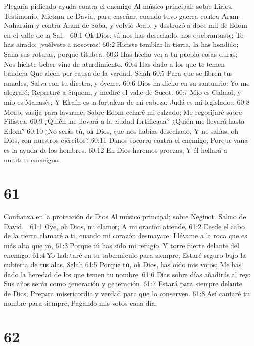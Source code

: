 Plegaria pidiendo ayuda contra el enemigo 
Al músico principal; sobre Lirios. Testimonio. Mictam de David, para enseñar, cuando tuvo guerra contra Aram-Naharaim y contra Aram de Soba, y volvió Joab, y destrozó a doce mil de Edom en el valle de la Sal. 

60:1 Oh Dios, tú nos has desechado, nos quebrantaste; 
Te has airado; ¡vuélvete a nosotros! 
60:2 Hiciste temblar la tierra, la has hendido; 
Sana sus roturas, porque titubea. 
60:3 Has hecho ver a tu pueblo cosas duras; 
Nos hiciste beber vino de aturdimiento. 
60:4 Has dado a los que te temen bandera 
Que alcen por causa de la verdad. Selah 
60:5 Para que se libren tus amados, 
Salva con tu diestra, y óyeme. 
60:6 Dios ha dicho en su santuario: Yo me alegraré; 
Repartiré a Siquem, y mediré el valle de Sucot. 
60:7 Mío es Galaad, y mío es Manasés; 
Y Efraín es la fortaleza de mi cabeza; 
Judá es mi legislador. 
60:8 Moab, vasija para lavarme; 
Sobre Edom echaré mi calzado; 
Me regocijaré sobre Filistea. 
60:9 ¿Quién me llevará a la ciudad fortificada? 
¿Quién me llevará hasta Edom? 
60:10 ¿No serás tú, oh Dios, que nos habías desechado, 
Y no salías, oh Dios, con nuestros ejércitos? 
60:11 Danos socorro contra el enemigo, 
Porque vana es la ayuda de los hombres. 
60:12 En Dios haremos proezas, 
Y él hollará a nuestros enemigos. 

\chapter{61}

Confianza en la protección de Dios 
Al músico principal; sobre Neginot. Salmo de David. 

61:1 Oye, oh Dios, mi clamor; 
A mi oración atiende. 
61:2 Desde el cabo de la tierra clamaré a ti, cuando mi corazón desmayare. 
Llévame a la roca que es más alta que yo, 
61:3 Porque tú has sido mi refugio, 
Y torre fuerte delante del enemigo. 
61:4 Yo habitaré en tu tabernáculo para siempre; 
Estaré seguro bajo la cubierta de tus alas. Selah 
61:5 Porque tú, oh Dios, has oído mis votos; 
Me has dado la heredad de los que temen tu nombre. 
61:6 Días sobre días añadirás al rey; 
Sus años serán como generación y generación. 
61:7 Estará para siempre delante de Dios; 
Prepara misericordia y verdad para que lo conserven. 
61:8 Así cantaré tu nombre para siempre, 
Pagando mis votos cada día. 

\chapter{62}

